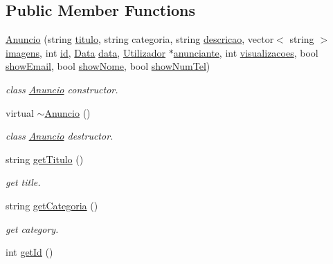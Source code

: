 \subsection*{Public Member Functions}
\begin{DoxyCompactItemize}
\item 
\hyperlink{class_anuncio_adddca26d8f1f8d2e3ad186327e9961d7}{Anuncio} (string \hyperlink{class_anuncio_adb34bedd8220f42b9ee37662c21313e6}{titulo}, string categoria, string \hyperlink{class_anuncio_aa6a9eb8d08cb06d16061b006eb2c8b97}{descricao}, vector$<$ string $>$ \hyperlink{class_anuncio_a9ff3646a44a2e285d082682e37631ac7}{imagens}, int \hyperlink{class_anuncio_a42900203e39da639a1128277dbd96baf}{id}, \hyperlink{class_data}{Data} \hyperlink{class_anuncio_a2c35b71b56332894a705eb2770d5102b}{data}, \hyperlink{class_utilizador}{Utilizador} $\ast$\hyperlink{class_anuncio_ac89450835a3cd86dac14bda6dfd83934}{anunciante}, int \hyperlink{class_anuncio_ae3fb8cd61ec06485ee166cd3b5d80804}{visualizacoes}, bool \hyperlink{class_anuncio_a6a41218c0a11ba393522d3a9a80ded95}{show\+Email}, bool \hyperlink{class_anuncio_a50feea41d2253cd5168243b18fa03aa6}{show\+Nome}, bool \hyperlink{class_anuncio_a8db5dc7339e63974c643a6602f2cf7bc}{show\+Num\+Tel})
\begin{DoxyCompactList}\small\item\em class \hyperlink{class_anuncio}{Anuncio} constructor. \end{DoxyCompactList}\item 
virtual \hyperlink{class_anuncio_a1b50fee97e9141cff94496f955c92007}{$\sim$\+Anuncio} ()
\begin{DoxyCompactList}\small\item\em class \hyperlink{class_anuncio}{Anuncio} destructor. \end{DoxyCompactList}\item 
string \hyperlink{class_anuncio_a2c010aa184ce0bf61cba53b9522600d1}{get\+Titulo} ()
\begin{DoxyCompactList}\small\item\em get title. \end{DoxyCompactList}\item 
string \hyperlink{class_anuncio_af26171f61e932164bde1d61223e91602}{get\+Categoria} ()
\begin{DoxyCompactList}\small\item\em get category. \end{DoxyCompactList}\item 
int \hyperlink{class_anuncio_a5c5c7d6f2c2d95bd12ecae634f6b176f}{get\+Id} ()

\end{DoxyCompactItemize}
